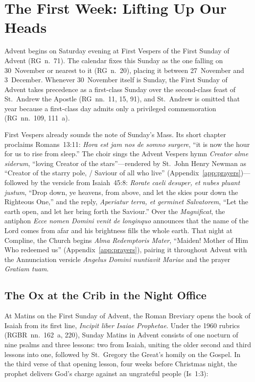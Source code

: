 \section{The First Week: Lifting Up Our Heads}\label{sec:week-1}

Advent begins on Saturday evening at First Vespers of the First Sunday
of Advent (RG~n.~71). The calendar fixes this Sunday as the one falling
on 30~November or nearest to it (RG~n.~20), placing it between
27~November and 3~December. Whenever 30~November itself is Sunday, the
First Sunday of Advent takes precedence as a first-class Sunday over the
second-class feast of St.~Andrew the Apostle (RG~nn.~11, 15, 91), and
St.~Andrew is omitted that year because a first-class day admits only a
privileged commemoration (RG~nn.~109, 111~a).

First Vespers already sounds the note of Sunday's Mass. Its short
chapter proclaims Romans~13:11: \textit{Hora est jam nos de somno
surgere}, ``it is now the hour for us to rise from sleep.'' The choir
sings the Advent Vespers hymn \textit{Creator alme siderum}, ``loving
Creator of the stars''---rendered by St.~John Henry Newman as
``Creator of the starry pole, / Saviour of all who live''
(Appendix~\ref{app:prayers})---followed by the versicle from
Isaiah~45:8: \textit{Rorate caeli desuper, et nubes pluant justum},
``Drop down, ye heavens, from above, and let the skies pour down the
Righteous One,'' and the reply, \textit{Aperiatur terra, et germinet
Salvatorem}, ``Let the earth open, and let her bring forth the
Saviour.'' Over the \textit{Magnificat}, the antiphon \textit{Ecce nomen
Domini venit de longinquo} announces that the name of the Lord comes
from afar and his brightness fills the whole earth. That night at
Compline, the Church begins \textit{Alma Redemptoris Mater}, ``Maiden!
Mother of Him Who redeemed us'' (Appendix~\ref{app:prayers}), pairing it
throughout Advent with the Annunciation versicle \textit{Angelus Domini
nuntiavit Mariae} and the prayer \textit{Gratiam tuam}.

\subsection{The Ox at the Crib in the Night Office}

At Matins on the First Sunday of Advent, the Roman Breviary opens the
book of Isaiah from its first line, \textit{Incipit liber Isaiae
Prophetae}. Under the 1960 rubrics (RGBR~nn.~162~a, 220), Sunday Matins
in Advent consists of one nocturn of nine psalms and three lessons: two
from Isaiah, uniting the older second and third lessons into one,
followed by St.~Gregory the Great's homily on the Gospel. In the third
verse of that opening lesson, four weeks before Christmas night, the
prophet delivers God's charge against an ungrateful people (Is~1:3):

